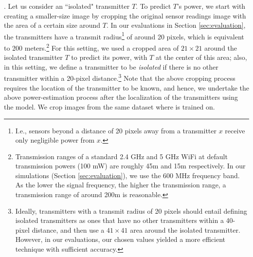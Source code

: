 . 
Let us consider an ``isolated" transmitter $T$. 
To predict $T$'s power, we start with
creating a smaller-size image by cropping the original sensor readings image with the area of a certain size around $T$. 
In our evaluations in Section \ref{sec:evaluation}, the transmitters have a transmit radius\footnote{I.e., sensors beyond a distance of 20 pixels away from a transmitter $x$ receive only negligible power from $x$.}
of around 20 pixels, which is equivalent to 200 meters.\footnote{Transmission ranges of a standard 2.4 GHz and 5 GHz WiFi at default transmission powers (100 mW) are roughly 45m and 15m respectively. 
In our simulations (Section \ref{sec:evaluation}), we use the 600 MHz frequency band. 
As the lower the signal frequency, the higher the transmission range, a transmission range of around 200m is reasonable.}
For this setting, we used a cropped area of $21 \times 21$ around the isolated transmitter $T$ to predict its power, with $T$ at the center of this area; also, in this setting, we define a transmitter to be {\em isolated} if there is no other transmitter within a 20-pixel 
distance.\footnote{Ideally, transmitters with a transmit radius of 20 pixels should entail defining isolated transmitters as ones that have no other transmitters within a 40-pixel distance, and then use a
$41\times41$ area around the isolated transmitter. However, in our evaluations, our chosen values yielded a more efficient technique with sufficient accuracy.}
Note that the above cropping process requires the location of the transmitter to be known, and hence, we undertake the above power-estimation process after the localization of the transmitters using the \our model.  
We crop images from the same dataset where \our is trained on.

